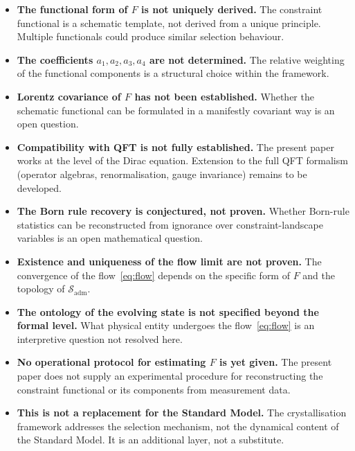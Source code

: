 \documentclass[12pt]{article}
\begin{document}
\begin{itemize}
    \item \textbf{The functional form of $F$ is not uniquely derived.} The constraint functional is a schematic template, not derived from a unique principle. Multiple functionals could produce similar selection behaviour.

    \item \textbf{The coefficients $a_1, a_2, a_3, a_4$ are not determined.} The relative weighting of the functional components is a structural choice within the framework.

    \item \textbf{Lorentz covariance of $F$ has not been established.} Whether the schematic functional can be formulated in a manifestly covariant way is an open question.

    \item \textbf{Compatibility with QFT is not fully established.} The present paper works at the level of the Dirac equation. Extension to the full QFT formalism (operator algebras, renormalisation, gauge invariance) remains to be developed.

    \item \textbf{The Born rule recovery is conjectured, not proven.} Whether Born-rule statistics can be reconstructed from ignorance over constraint-landscape variables is an open mathematical question.

    \item \textbf{Existence and uniqueness of the flow limit are not proven.} The convergence of the flow~\eqref{eq:flow} depends on the specific form of $F$ and the topology of $\mathcal{S}_{\mathrm{adm}}$.

    \item \textbf{The ontology of the evolving state is not specified beyond the formal level.} What physical entity undergoes the flow~\eqref{eq:flow} is an interpretive question not resolved here.

    \item \textbf{No operational protocol for estimating $F$ is yet given.} The present paper does not supply an experimental procedure for reconstructing the constraint functional or its components from measurement data.

    \item \textbf{This is not a replacement for the Standard Model.} The crystallisation framework addresses the selection mechanism, not the dynamical content of the Standard Model. It is an additional layer, not a substitute.
\end{itemize}
\end{document}

